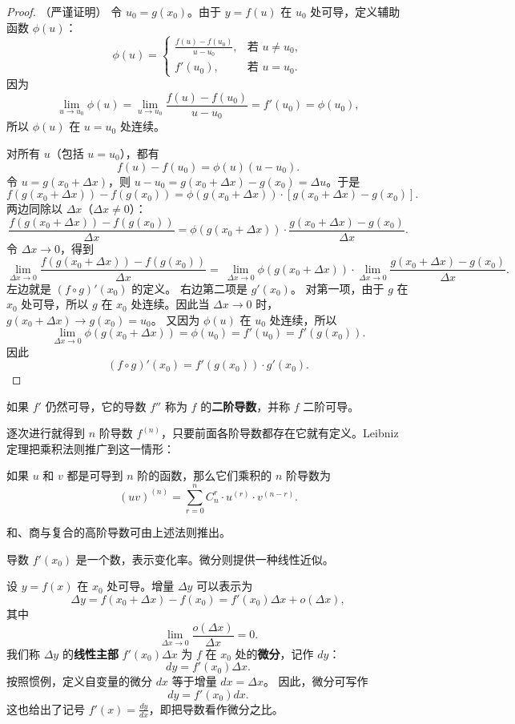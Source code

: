 \begin{proof}
（严谨证明）
令 $u_0=g(x_0)$。由于 $y=f(u)$ 在 $u_0$ 处可导，定义辅助函数 $\phi(u)$：
\[
\phi(u)=\begin{cases}
\frac{f(u)-f(u_0)}{u-u_0},&\text{若 }u\ne u_0,\\
f'(u_0),&\text{若 }u=u_0.
\end{cases}
\]
因为
\[
\lim_{u\to u_0}\phi(u)=\lim_{u\to u_0}\frac{f(u)-f(u_0)}{u-u_0}=f'(u_0)=\phi(u_0),
\]
所以 $\phi(u)$ 在 $u=u_0$ 处连续。

对所有 $u$（包括 $u=u_0$），都有
\[
f(u)-f(u_0)=\phi(u)(u-u_0).
\]
令 $u=g(x_0+\Delta x)$，则 $u-u_0=g(x_0+\Delta x)-g(x_0)=\Delta u$。于是
\[
f(g(x_0+\Delta x))-f(g(x_0))=\phi(g(x_0+\Delta x))\cdot [g(x_0+\Delta x)-g(x_0)].
\]
两边同除以 $\Delta x$（$\Delta x\ne 0$）：
\[
\frac{f(g(x_0+\Delta x))-f(g(x_0))}{\Delta x}=\phi(g(x_0+\Delta x))\cdot \frac{g(x_0+\Delta x)-g(x_0)}{\Delta x}.
\]
令 $\Delta x\to 0$，得到
\[
\lim_{\Delta x\to 0}\frac{f(g(x_0+\Delta x))-f(g(x_0))}{\Delta x}=\
\lim_{\Delta x\to 0}\phi(g(x_0+\Delta x))\cdot \lim_{\Delta x\to 0}\frac{g(x_0+\Delta x)-g(x_0)}{\Delta x}.
\]
左边就是 $(f\circ g)'(x_0)$ 的定义。
右边第二项是 $g'(x_0)$。
对第一项，由于 $g$ 在 $x_0$ 处可导，所以 $g$ 在 $x_0$ 处连续。因此当 $\Delta x\to 0$ 时，$g(x_0+\Delta x)\to g(x_0)=u_0$。
又因为 $\phi(u)$ 在 $u_0$ 处连续，所以
\[
\lim_{\Delta x\to 0}\phi(g(x_0+\Delta x))=\phi(u_0)=f'(u_0)=f'(g(x_0)).
\]
因此
\[
(f\circ g)'(x_0)=f'(g(x_0))\cdot g'(x_0).
\]
\end{proof}

\begin{definition}[二阶导数]
如果 $f'$ 仍然可导，它的导数 $f''$ 称为 $f$ 的\textbf{二阶导数}，并称 $f$ 二阶可导。
\end{definition}

逐次进行就得到 $n$ 阶导数 $f^{(n)}$，只要前面各阶导数都存在它就有定义。Leibniz 定理把乘积法则推广到这一情形：

\begin{theorem}[Leibniz 定理]
如果 $u$ 和 $v$ 都是可导到 $n$ 阶的函数，那么它们乘积的 $n$ 阶导数为
\[
(uv)^{(n)}=\sum_{r=0}^{n}C_n^r\cdot u^{(r)}\cdot v^{(n-r)}.
\]
\end{theorem}

和、商与复合的高阶导数可由上述法则推出。

导数 $f'(x_0)$ 是一个数，表示变化率。微分则提供一种线性近似。

\begin{definition}[微分]
设 $y=f(x)$ 在 $x_0$ 处可导。增量 $\Delta y$ 可以表示为
\[
\Delta y=f(x_0+\Delta x)-f(x_0)=f'(x_0)\Delta x+o(\Delta x),
\]
其中
\[
\lim_{\Delta x\to 0}\frac{o(\Delta x)}{\Delta x}=0.
\]
我们称 $\Delta y$ 的\textbf{线性主部} $f'(x_0)\Delta x$ 为 $f$ 在 $x_0$ 处的\textbf{微分}，记作 $dy$：
\[
dy=f'(x_0)\Delta x.
\]
按照惯例，定义自变量的微分 $dx$ 等于增量 $dx=\Delta x$。
因此，微分可写作
\[
dy=f'(x_0)dx.
\]
这也给出了记号 $f'(x)=\frac{dy}{dx}$，即把导数看作微分之比。
\end{definition}

